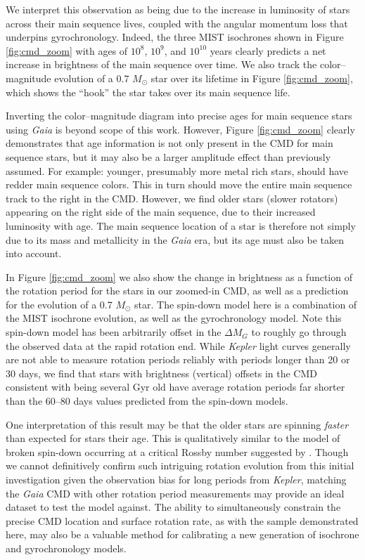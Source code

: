 \documentclass[preprint2]{aastex62}
\newcommand{\Kepler}{\textsl{Kepler}\xspace}
\begin{document}
We interpret this observation as being due to the increase in luminosity of stars across their main sequence lives, coupled with the angular momentum loss that underpins gyrochronology. Indeed, the three MIST isochrones shown in Figure \ref{fig:cmd_zoom} with ages of $10^8$, $10^9$, and $10^{10}$ years clearly predicts a net increase in brightness of the main sequence over time. We also track the color--magnitude evolution of a 0.7 $M_\odot$ star over its lifetime in Figure \ref{fig:cmd_zoom}, which shows the ``hook'' the star takes over its main sequence life. 

Inverting the color--magnitude diagram into precise ages for main sequence stars using {\em Gaia} is beyond scope of this work. However, Figure \ref{fig:cmd_zoom} clearly demonstrates that age information is not only present in the CMD for main sequence stars, but it may also be a larger amplitude effect than previously assumed. For example: younger, presumably more metal rich stars, should have redder main sequence colors. This in turn should move the entire main sequence track to the right in the CMD. However, we find older stars (slower rotators) appearing on the right side of the main sequence, due to their increased luminosity with age. The main sequence location of a star is therefore not simply due to its mass and metallicity in the {\em Gaia} era, but its age must also be taken into account.

In Figure \ref{fig:cmd_zoom} we also show the change in brightness as a function of the rotation period for the stars in our zoomed-in CMD, as well as a prediction for the evolution of a 0.7 $M_\odot$ star. The spin-down model here is a combination of the MIST isochrone evolution, as well as the \citet{meibom2009} gyrochronology model. Note this spin-down model has been arbitrarily offset in the $\Delta M_G$ to roughly go through the observed data at the rapid rotation end.
While \Kepler light curves generally are not able to measure rotation periods reliably with periods longer than 20 or 30 days, we find that stars with brightness (vertical) offsets in the CMD consistent with being several Gyr old have average rotation periods far shorter than the 60--80 days values predicted from the spin-down models.

One interpretation of this result may be that the older stars are spinning {\it faster} than expected for stars their age. This is qualitatively similar to the model of broken spin-down occurring at a critical Rossby number suggested by \citet{van-saders2016}. Though we cannot definitively confirm such intriguing rotation evolution from this initial investigation given the observation bias for long periods from \Kepler, matching the {\em Gaia} CMD with other rotation period measurements may provide an ideal dataset to test the \citet{van-saders2016} model against. The ability to simultaneously constrain the precise CMD location and surface rotation rate, as with the sample demonstrated here, may also be a valuable method for calibrating a new generation of isochrone and gyrochronology models.
\end{document}
